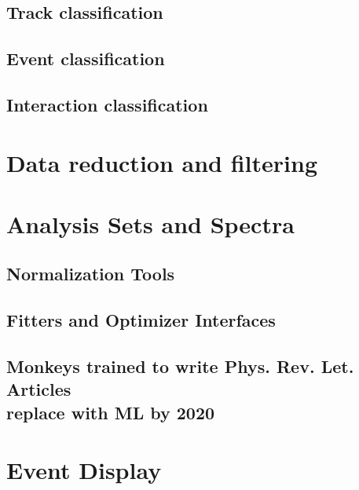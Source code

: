 \subsection{Track classification}
\subsection{Event classification}
\subsection{Interaction classification}
\section{Data reduction and filtering}
\section{Analysis Sets and Spectra}
\subsection{Normalization Tools}
\subsection{Fitters and Optimizer Interfaces}
\subsection{Monkeys trained to write Phys. Rev. Let. Articles\\ replace with ML by 2020}
\section{Event Display}  %
